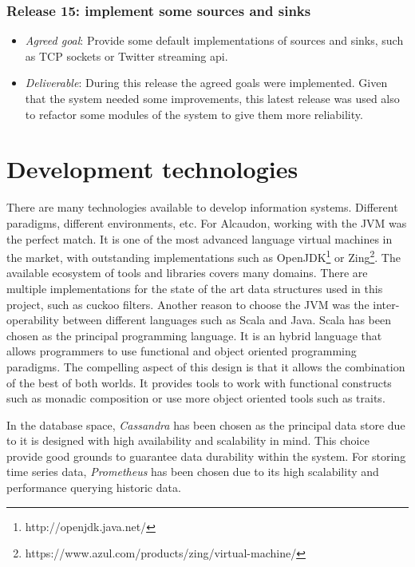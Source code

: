 \subsubsection{Release 15: implement some sources and sinks}
\begin{itemize}
\item \textit{Agreed goal}: Provide some default implementations of sources and
  sinks, such as TCP sockets or Twitter streaming api.
\item \textit{Deliverable}: During this release the agreed goals were implemented. Given
  that the system needed some improvements, this latest release was used also to refactor
  some modules of the system to give them more reliability.
\end{itemize}

\section{Development technologies}

There are many technologies available to develop information systems. Different
paradigms, different environments, etc. For Alcaudon, working with the JVM
was the perfect match. It is one of the most advanced language virtual
machines in the market, with outstanding implementations such as
OpenJDK\footnote{http://openjdk.java.net/} or
Zing\footnote{https://www.azul.com/products/zing/virtual-machine/}. The
available ecosystem of tools and libraries covers many domains. There are
multiple implementations for the state of the art data structures used in this
project, such as cuckoo filters\cite{cuckoo}. Another reason to choose the JVM
was the inter-operability between different languages such as Scala and Java.
Scala has been chosen as the principal programming language.
It is an hybrid language that allows programmers to use functional and object
oriented programming paradigms. The compelling aspect of this design is that it
allows the combination of the best of both worlds. It provides tools to work
with functional constructs such as monadic composition or use more object
oriented tools such as traits.

In the database space, \textit{Cassandra} has been chosen as the principal data store due
to it is designed with high availability and scalability in mind. This choice
provide good grounds to guarantee data durability within the system. For storing
time series data, \textit{Prometheus} has been chosen due to its high scalability and
performance querying historic data.

